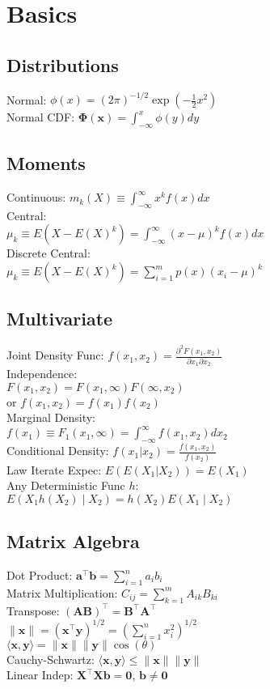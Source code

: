 \section{Basics}
\subsection*{Distributions}
Normal: $\phi(x) = (2\pi)^{-1/2}\exp (- \frac{1}{2}x^2)$\\
Normal CDF: $\mathbf{\Phi(x)} = \int_{-\infty}^{x} \phi(y) dy$\\
\subsection*{Moments}
Continuous: $m_k (X) \equiv \int_{-\infty}^{\infty} x^k f(x)dx$\\
Central:\\
$\mu_k \equiv E(X - E(X)^k) = \int_{-\infty}^{\infty} (x-\mu)^k f(x)dx$\\
Discrete Central:\\
$\mu_k \equiv E(X - E(X)^k) = \sum_{i=1}^{m} p(x)(x_i-\mu)^k$\\
\subsection*{Multivariate}
Joint Density Func: $f(x_1, x_2) = \frac{\partial^2 F(x_1, x_2)}{\partial x_1 \partial x_2}$\\
Independence:\\
$F(x_1, x_2) = F(x_1, \infty)F(\infty, x_2)$\\
or $f(x_1, x_2) = f(x_1)f(x_2)$\\
Marginal Density:\\
$f(x_1) \equiv F_1 (x_1, \infty) = \int_{-\infty}^{\infty} f(x_1, x_2) dx_2$\\
Conditional Density: $f(x_1 \vert x_2) = \frac{f(x_1, x_2)}{f(x_2)}$\\
Law Iterate Expec: $E(E(X_1 \vert X_2)) = E(X_1)$\\
Any Deterministic Func $h$:\\
$E(X_1 h(X_2) \mid X_2) = h(X_2)E(X_1 \mid X_2)$\\
\subsection*{Matrix Algebra}
Dot Product: $\mathbf{a}^{\top}\mathbf{b} = \sum_{i=1}^{n}a_{i}b_i$\\
Matrix Multiplication: $C_{ij} = \sum_{k=1}^{m} A_{ik}B_{ki}$\\
Transpose: $(\mathbf{A}\mathbf{B})^{\top} = \mathbf{B}^{\top} \mathbf{A}^{\top}$\\
$\lVert \mathbf{x} \rVert = (\mathbf{x}^{\top}\mathbf{y})^{1/2} = \left( \sum_{i=1}^{n} x_i ^2 \right)^{1/2}$\\
$\langle \mathbf{x}, \mathbf{y} \rangle = \lVert \mathbf{x} \rVert \lVert \mathbf{y} \rVert \cos(\theta)$\\
Cauchy-Schwartz: $\langle \mathbf{x}, \mathbf{y} \rangle \leq \lVert \mathbf{x} \rVert \lVert \mathbf{y} \rVert$\\
Linear Indep: $\mathbf{X}^{\top}\mathbf{X}\mathbf{b} = \mathbf{0}$, $\mathbf{b} \neq \mathbf{0}$\\